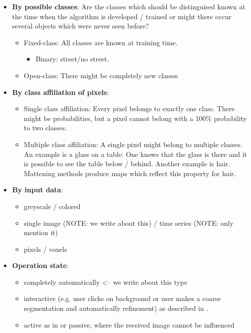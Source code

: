 \begin{itemize}
    \item \textbf{By possible classes}: Are the classes which should be distinguised
          known at the time when the algorithm is developed / trained or might
          there occur several objects which were never seen before?
          \begin{itemize}
              \item Fixed-class: All classes are known at training time.
              \begin{itemize}
                  \item Binary: street/no street.
              \end{itemize}
              \item Open-class: There might be completely new classes
          \end{itemize}
    \item \textbf{By class affiliation of pixels}:
        \begin{itemize}
            \item Single class affiliation: Every pixel belongs to exactly one class. There might
                  be probabilities, but a pixel cannot belong with a 100\%
                  probability to two classes.
            \item Multiple class affiliation: A single pixel might belong to
                  multiple classes. An example is a glass on a table: One
                  knows that the glass is there and it is possible to see the
                  table below / behind. Another example is hair. Mattening
                  methods produce maps which reflect this property for hair.\cite{levin2008spectral}
        \end{itemize}
    \item \textbf{By input data}:
          \begin{itemize}
              \item greyscale / colored
              \item single image (NOTE: we write about this) / time series (NOTE: only mention it)
              \item pixels / voxels \cite{wolz2012multi}
          \end{itemize}
    \item \textbf{Operation state}:
        \begin{itemize}
            \item completely automatically <-- we write about this type
            \item interactive (e.g. user clicks on background or user makes a
                  coarse segmentation and automatically refinement) as
                  described in
                  \cite{protiere2007interactive,rother2004grabcut}.
            \item active as in
                  \cite{schiebener2011segmentation,schiebener2012discovery} or
                  passive, where the received image cannot be influenced
        \end{itemize}
\end{itemize}

